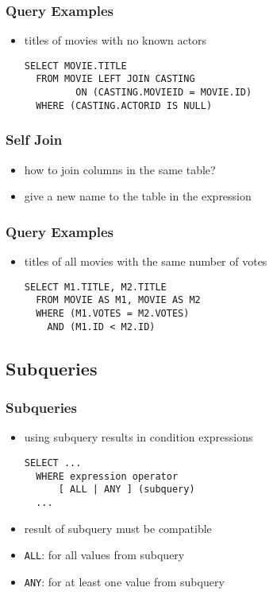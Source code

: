 \documentclass[dvipsnames]{beamer}
\theoremstyle{plain}
\begin{document}
\begin{frame}[fragile]
  \frametitle{Query Examples}

  \begin{itemize}
    \item titles of movies with no known actors
    \begin{lstlisting}
SELECT MOVIE.TITLE
  FROM MOVIE LEFT JOIN CASTING
         ON (CASTING.MOVIEID = MOVIE.ID)
  WHERE (CASTING.ACTORID IS NULL)
    \end{lstlisting}
  \end{itemize}
\end{frame}

\begin{frame}[fragile]
  \frametitle{Self Join}

  \begin{itemize}
    \item how to join columns in the same table?
    \item give a new name to the table in the expression
  \end{itemize}
\end{frame}

\begin{frame}[fragile]
  \frametitle{Query Examples}

  \begin{itemize}
    \item titles of all movies with the same number of votes

    \medskip
    \lstinline!SELECT M1.TITLE, M2.TITLE!\\
    \lstinline!  FROM MOVIE AS M1, MOVIE AS M2!\\
    \lstinline!  WHERE (M1.VOTES = M2.VOTES)!\\
    \pause
    \lstinline!    AND (M1.ID < M2.ID)!
  \end{itemize}
\end{frame}

\subsection{Subqueries}

\begin{frame}[fragile]
  \frametitle{Subqueries}

  \begin{itemize}
    \item using subquery results in condition expressions
    \begin{lstlisting}
SELECT ...
  WHERE expression operator
      [ ALL | ANY ] (subquery)
  ...
    \end{lstlisting}

    \item result of subquery must be compatible
    \item \lstinline!ALL!: for all values from subquery
    \item \lstinline!ANY!: for at least one value from subquery
  \end{itemize}
\end{frame}
\end{document}
